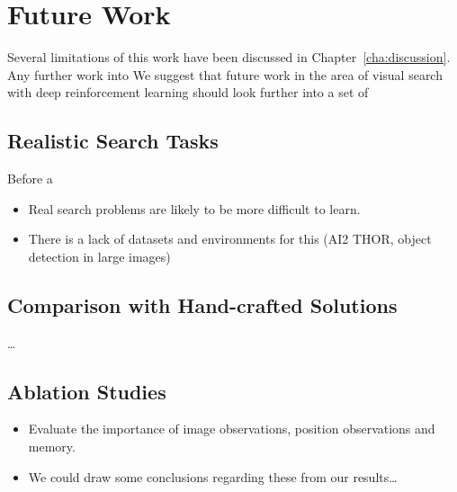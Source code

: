 \section{Future Work}

Several limitations of this work have been discussed in Chapter~\ref{cha:discussion}.
Any further work into 
We suggest that future work in the area of visual search with deep reinforcement learning should look further into a set of 

\subsection{Realistic Search Tasks}

Before a 

\begin{itemize}
    \item Real search problems are likely to be more difficult to learn.
    \item There is a lack of datasets and environments for this (AI2 THOR, object detection in large images)
\end{itemize}

\subsection{Comparison with Hand-crafted Solutions}

\dots

\subsection{Ablation Studies}

\begin{itemize}
    \item Evaluate the importance of image observations, position observations and memory.
    \item We could draw some conclusions regarding these from our results\dots
\end{itemize}


